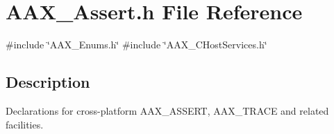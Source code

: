 \hypertarget{a00395}{}\section{A\+A\+X\+\_\+\+Assert.\+h File Reference}
\label{a00395}
{\ttfamily \#include \char`\"{}A\+A\+X\+\_\+\+Enums.\+h\char`\"{}}\newline
{\ttfamily \#include \char`\"{}A\+A\+X\+\_\+\+C\+Host\+Services.\+h\char`\"{}}\newline


\subsection{Description}
Declarations for cross-\/platform A\+A\+X\+\_\+\+A\+S\+S\+E\+RT, A\+A\+X\+\_\+\+T\+R\+A\+CE and related facilities. 


